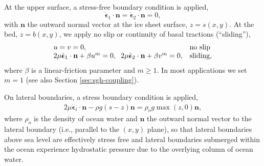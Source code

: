 At the upper surface, a stress-free boundary condition is applied, 
\begin{equation} \label{eq:stressFreeBC}
\dot{\boldsymbol{\epsilon}}_1 \cdot \mathbf{n} = \dot{\boldsymbol{\epsilon}}_2 \cdot \mathbf{n} = 0,%
\end{equation}
with $\mathbf{n}$ the outward normal vector at the ice sheet surface, $z=s(x,y)$. At the bed, $z=b(x,y)$, we apply no slip or continuity of basal tractions (``sliding''),
\begin{equation} \label{eq:basalBC}
\begin{array}{ll}
u = v = 0, & \text{no slip} \\%
2\mu \dot{\boldsymbol{\epsilon}}_1 \cdot \mathbf{n} + \beta u^{m} = 0, \hspace{0.2cm} 2 \mu \dot{\boldsymbol{\epsilon}}_2 \cdot \mathbf{n} + \beta v^{m} = 0, & \text{sliding,} \\%
\end{array}
\end{equation}
where $\beta$ is a linear-friction parameter and $m\geq1$. In most applications we set $m = 1$ (see also Section \ref{sec:sgh-coupling}).   

On lateral boundaries, a stress boundary condition is applied, 
\begin{equation}\label{eq:oceanBC}
\begin{array}{ll}
2 \mu \dot{\boldsymbol{\epsilon}}_i \cdot \mathbf{n} -\rho g (s-z)\mathbf{n} = \rho_o g \max(z,0) \mathbf{n}, %
\end{array}
\end{equation}
where $\rho_o$ is the density of ocean water and $\mathbf{n}$ the outward normal vector to the lateral boundary (i.e., parallel to the $(x,y)$ plane), so that lateral boundaries above sea level are effectively stress free and lateral boundaries submerged within the ocean experience hydrostatic pressure due to the overlying column of ocean water. 

